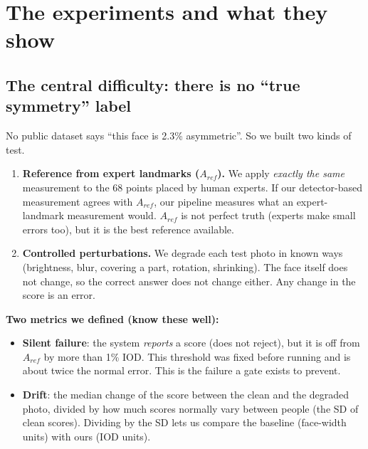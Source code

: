 \section{The experiments and what they show}

\subsection{The central difficulty: there is no ``true symmetry'' label}
No public dataset says ``this face is 2.3\% asymmetric''. So we built two kinds of test.
\begin{enumerate}
\item \textbf{Reference from expert landmarks ($A_{ref}$).} We apply \emph{exactly the same}
measurement to the 68 points placed by human experts. If our detector-based measurement
agrees with $A_{ref}$, our pipeline measures what an expert-landmark measurement would.
$A_{ref}$ is not perfect truth (experts make small errors too), but it is the best reference
available.
\item \textbf{Controlled perturbations.} We degrade each test photo in known ways
(brightness, blur, covering a part, rotation, shrinking). The face itself does not change, so
the correct answer does not change either. Any change in the score is an error.
\end{enumerate}

\textbf{Two metrics we defined (know these well):}
\begin{itemize}
\item \textbf{Silent failure}: the system \emph{reports} a score (does not reject), but it is
off from $A_{ref}$ by more than 1\% IOD. This threshold was fixed before running and is about
twice the normal error. This is the failure a gate exists to prevent.
\item \textbf{Drift}: the median change of the score between the clean and the degraded photo,
divided by how much scores normally vary between people (the SD of clean scores). Dividing
by the SD lets us compare the baseline (face-width units) with ours (IOD units).
\end{itemize}

